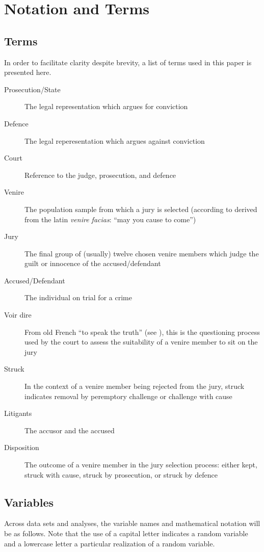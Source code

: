 \chapter*{Notation and Terms}
\label{c:Notation}

\section{Terms}

In order to facilitate clarity despite brevity, a list of terms used in this paper is presented here.

\begin{description}
\item[Prosecution/State] The legal representation which argues for conviction
\item[Defence] The legal reperesentation which argues against conviction
\item[Court] Reference to the judge, prosecution, and defence
\item[Venire] The population sample from which a jury is selected (according to \cite{venireety} derived from the latin
  \textit{venire facias}: ``may you cause to come'') 
\item[Jury] The final group of (usually) twelve chosen venire members which judge the guilt or innocence of the
    accused/defendant
\item[Accused/Defendant] The individual on trial for a crime
\item[Voir dire] From old French ``to speak the truth'' (see \cite{voirety}), this is the questioning process used by the court to
  assess the suitability of a venire member to sit on the jury
\item[Struck] In the context of a venire member being rejected from the jury, struck indicates removal by peremptory challenge or
  challenge with cause
\item[Litigants] The accusor and the accused
\item[Disposition] The outcome of a venire member in the jury selection process: either kept, struck with cause, struck by
  prosecution, or struck by defence
\end{description}

\section{Variables} \label{not:variables}

Across data sets and analyses, the variable names and mathematical notation will be as follows. Note that the use of a capital
letter indicates a random variable and a lowercase letter a particular realization of a random variable.

